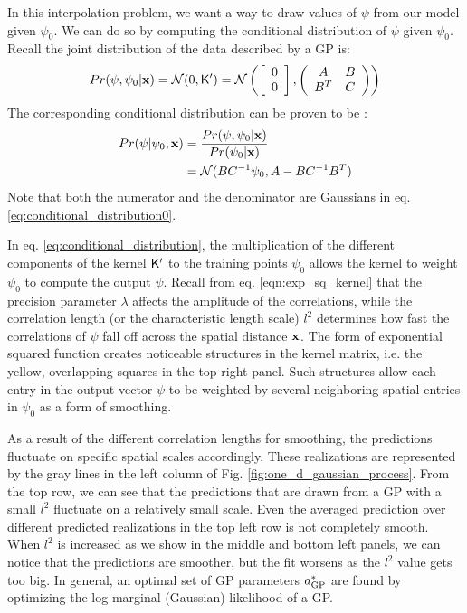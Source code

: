 In this interpolation problem, we want a way to draw values of $\psi$ from our
model given $\psi_0$. We can do so by computing the conditional distribution of 
$\psi$ given $\psi_0$. Recall the joint distribution of the data
described by a GP is:
\begin{equation}
	Pr(\psi, \psi_0 | \mathbf{x}) = \mathcal{N}(0, \mathsf{K}') =  \mathcal{N}\left(\left[\begin{array}{c} 0 \\ 0 \end{array} \right], 
	\left(
	\begin{array}{cc}
		A & B \\
		B^T & C
	\end{array}
	\right)
		\right)
\end{equation}
The corresponding conditional distribution can be proven to be \citep{Rasmussen2006}:
\begin{align}
	Pr(\psi | \psi_0, \mathbf{x}) &= \frac{Pr(\psi, \psi_0 | \mathbf{x})}{Pr(\psi_0 | \mathbf{x})} \label{eq:conditional_distribution0}\\
	&= \mathcal{N}(BC^{-1}\psi_0, A - BC^{-1}B^T)\label{eq:conditional_distribution}
\end{align}
Note that both the numerator and the denominator are Gaussians in eq.
\ref{eq:conditional_distribution0}. 

In eq. \ref{eq:conditional_distribution}, the multiplication of the different
components of the kernel $\mathsf{K}'$ to
the training points $\psi_0$ allows the kernel to weight $\psi_0$ to compute
the output $\psi$. 
Recall from eq. \ref{eqn:exp_sq_kernel} that 
the precision parameter $\lambda$ affects the 
amplitude of the correlations, while the correlation length (or
the characteristic length scale) $l^2$ 
determines how fast the correlations of  $\psi$ 
fall off across the spatial distance $\mathbf{x}$. 
The form of exponential squared function creates noticeable structures in the
kernel matrix, i.e. the yellow,
overlapping squares in the top right panel. 
Such structures allow each entry in the output vector $\psi$ to be weighted by
several neighboring spatial entries in $\psi_0$ as a form of smoothing.

As a result of the different correlation lengths for smoothing, 
the predictions fluctuate on specific spatial scales accordingly.
These realizations are represented by the gray lines in the left column of Fig.
\ref{fig:one_d_gaussian_process}. From the top row, we can see that 
the predictions that are drawn from a GP with a small $l^2$ 
fluctuate on a relatively small scale. Even the averaged prediction over
different predicted realizations in the top
left row is not completely smooth. When $l^2$ is increased as we show in the
middle and bottom left panels, we can notice that the predictions are
smoother, but the fit worsens as the $l^2$ value gets too big. In general,  
an optimal set of GP parameters $a_{\rm GP}^*$ are found by optimizing the log
marginal (Gaussian) likelihood of a GP.

